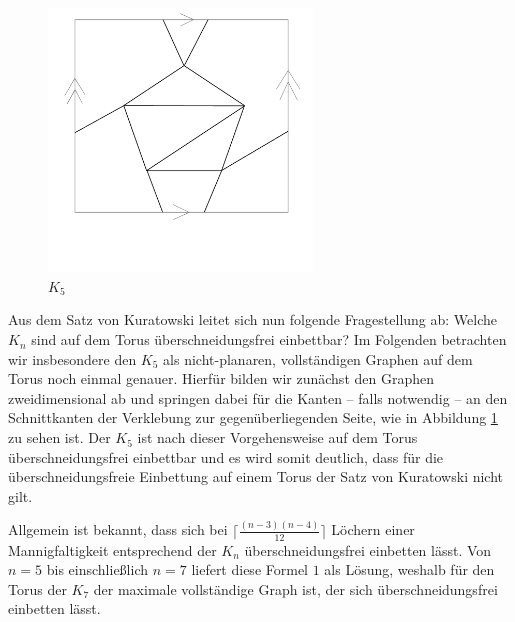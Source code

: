 \begin{figure}
	\centering
		\includegraphics[width=7cm]{img/K5.png}
\caption{$K_5$}
\label{k5}
\end{figure}
Aus dem Satz von Kuratowski leitet sich nun folgende Fragestellung ab: Welche $K_{n}$ sind auf dem Torus überschneidungsfrei einbettbar? Im Folgenden betrachten wir insbesondere den $K_5$ als nicht-planaren, vollständigen Graphen auf dem Torus noch einmal genauer.
Hierfür bilden wir zunächst den Graphen zweidimensional ab und springen dabei für die Kanten -- falls notwendig -- an den Schnittkanten der Verklebung zur gegenüberliegenden Seite, wie in Abbildung \ref{k5}  zu sehen ist. Der $K_5$ ist nach dieser Vorgehensweise auf dem Torus überschneidungsfrei einbettbar und es wird somit deutlich, dass für die überschneidungsfreie Einbettung auf einem Torus der Satz von Kuratowski nicht gilt.

Allgemein ist bekannt, dass sich bei $\lceil \frac{(n-3)(n-4)}{12} \rceil$ Löchern einer Mannigfaltigkeit entsprechend der $K_{n}$ überschneidungsfrei einbetten lässt. Von $n = 5$ bis einschließlich $n = 7$ liefert diese Formel $1$ als Lösung, weshalb für den Torus der $K_7$ der maximale vollständige Graph ist, der sich überschneidungsfrei einbetten lässt.

